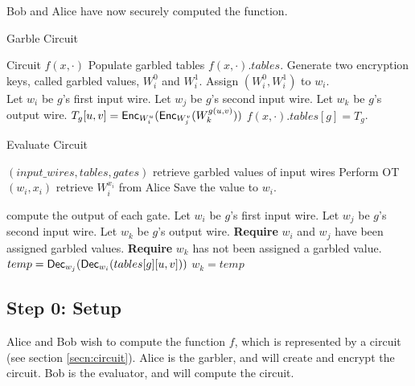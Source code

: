 Bob and Alice have now securely computed the function.


\begin{algorithm}
\caption{Garble Circuit}
\label{alg:garble}
\begin{algorithmic}
    \Require Circuit $f(x,\cdot)$ 
    \Ensure Populate garbled tables $f(x,\cdot).tables$.
    \State Generate two encryption keys, called garbled values, $W_i^0$ and $W_i^1$.
    \State Assign $(W_i^0, W_i^1)$ to $w_i$.
\EndFor \\

    \State Let $w_i$ be $g$'s first input wire.
    \State Let $w_j$ be $g$'s second input wire.
    \State Let $w_k$ be $g$'s output wire.
    \State $T_g[u,v] = \textsf{Enc}_{W_i^u}( \textsf{Enc}_{W_j^v} ( W_k^{g(u,v)}))$
    \EndFor
    \State $f(x,\cdot).tables[g] = T_g$.
\EndFor
\end{algorithmic}
\end{algorithm}

\begin{algorithm}
\caption{Evaluate Circuit}
\label{alg:evaluate}
\begin{algorithmic}

\Require $(input\_wires, tables, gates)$
	\Comment retrieve garbled values of input wires
	\State Perform OT$(w_i, x_i)$ 
	\Comment retrieve $W^{x_i}_i$ from Alice
	\State Save the value to $w_i$.
\EndFor

	\Comment compute the output of each gate.
	\State Let $w_i$ be $g$'s first input wire.
	\State Let $w_j$ be $g$'s second input wire.
	\State Let $w_k$ be $g$'s output wire.
	\State \textbf{Require} $w_i$ and $w_j$ have been assigned garbled values.
	\State \textbf{Require} $w_k$ has not been assigned a garbled value.
		\State $temp = \textsf{Dec}_{w_j}(\textsf{Dec}_{w_i}(tables[g][u,v]))$
			\State $w_k = temp$
		\EndIf
	\EndFor
\EndFor
\end{algorithmic}
\end{algorithm}

\subsection{Step 0: Setup}
Alice and Bob wish to compute the function $f$, which is represented by a circuit (see section \ref{secn:circuit}).
Alice is the garbler, and will create and encrypt the circuit.
Bob is the evaluator, and will compute the circuit.


